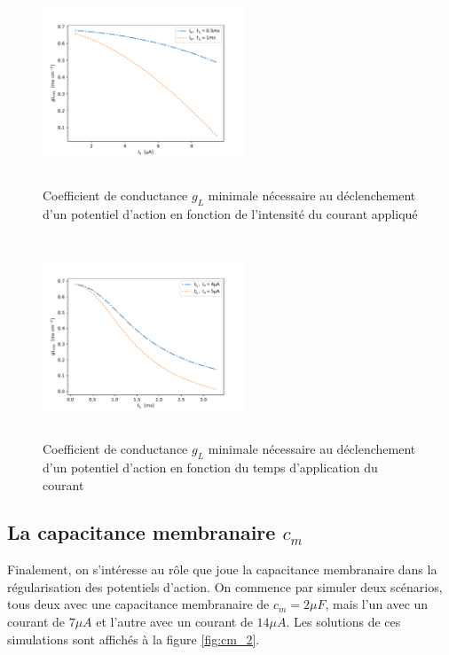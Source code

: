 \documentclass{article}
\begin{document}
\begin{figure}[H]
	\includegraphics[width=6cm, height=6cm]{MingLAmperage.pdf}
	\centering
	\caption{Coefficient de conductance $g_L$ minimale  nécessaire au déclenchement d'un potentiel d'action en fonction de l'intensité du courant appliqué}
	\label{fig:gl_intensite}
\end{figure}

\begin{figure}[H]
	\includegraphics[width=6cm, height=6cm]{MingLLength.pdf}
	\centering
	\caption{Coefficient de conductance $g_L$  minimale nécessaire au déclenchement d'un potentiel d'action en fonction du temps d'application du courant}
	\label{fig:gl_length}
\end{figure}


\subsection{La capacitance membranaire $c_m$}\label{sec:capacitance_membranaire}

Finalement, on s'intéresse au rôle que joue la capacitance membranaire dans la régularisation des potentiels d'action. On commence par simuler deux scénarios, tous deux avec une capacitance membranaire de $c_m = 2 \mu F$, mais l'un avec un courant de $7 \mu A$  et l'autre avec un courant de $14 \mu A$. Les solutions de ces simulations sont affichés à la figure \ref{fig:cm_2}. 
\end{document}
